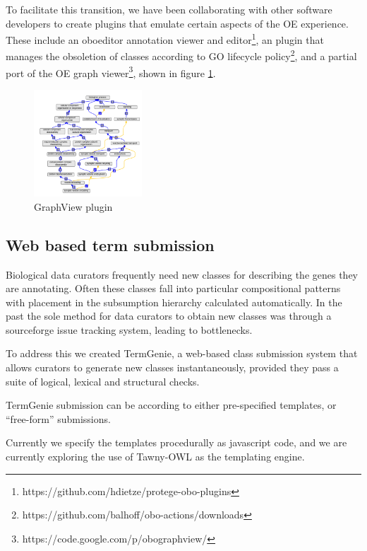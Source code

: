 \documentclass{llncs}
\begin{document}
To facilitate this transition, we have been collaborating with other
software developers to create plugins that emulate certain aspects of
the OE experience. These include an oboeditor annotation viewer and
editor\footnote{https://github.com/hdietze/protege-obo-plugins}, an
plugin that manages the obsoletion of classes according to GO
lifecycle policy\footnote{https://github.com/balhoff/obo-actions/downloads}, and a partial
port of the OE graph
viewer\footnote{https://code.google.com/p/obographview/}, shown in figure
\ref{gv}.

\begin{figure}
\label{gv}
\center
\includegraphics[height=4cm]{gv-plugin}
\caption{GraphView plugin}
\end{figure}

\subsection{Web based term submission}

Biological data curators frequently need new classes for describing
the genes they are annotating. Often these classes fall into
particular compositional patterns with placement in the subsumption
hierarchy calculated automatically. In the past the sole method for
data curators to obtain new classes was through a sourceforge issue
tracking system, leading to bottlenecks.

To address this we created TermGenie\cite{Dietze2014}, a web-based
class submission system that allows curators to generate new classes
instantaneously, provided they pass a suite of logical, lexical and
structural checks.

TermGenie submission can be according to either pre-specified
templates, or ``free-form'' submissions.

Currently we specify the templates procedurally as javascript code,
and we are currently exploring the use of Tawny-OWL\cite{Tawny} as the
templating engine.
\end{document}
